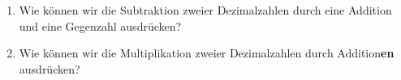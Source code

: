 \begin{exercise}
\begin{figure}[H]
\begin{minipage}{0.7\textwidth}
\begin{adjustbox}{width=\textwidth}
\end{adjustbox}

\end{minipage}
\end{figure}

%
%
%
%
%
%
%
%
\end{exercise}

\begin{exercise}
\begin{enumerate}
\item Wie können wir die Subtraktion zweier Dezimalzahlen durch eine Addition und eine Gegenzahl ausdrücken?

\fillwithgrid	{0.75in}

\item Wie können wir die Multiplikation zweier Dezimalzahlen durch Addition\textbf{en} ausdrücken?

\fillwithgrid	{0.75in}

\end{enumerate}
\end{exercise}

